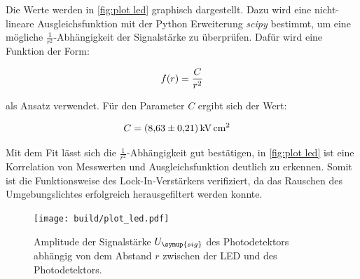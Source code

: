 Die Werte werden in \autoref{fig:plot led} graphisch dargestellt.
Dazu wird eine nicht-lineare Ausgleichsfunktion mit der Python Erweiterung \textit{scipy} \cite{scipy} bestimmt, um eine mögliche 
$\frac{1}{r^2}$-Abhängigkeit der Signalstärke zu überprüfen. Dafür wird eine Funktion der Form:

\begin{equation}
  f(r)=\frac{C}{r^2} \notag
\end{equation}

als Ansatz verwendet.
Für den Parameter $C$ ergibt sich der Wert:

\begin{align}
  C &= \qty{8.63+-0.21}{\kilo\volt\square\centi\metre} \notag
\end{align}

Mit dem Fit lässt sich die $\frac{1}{r^2}$-Abhängigkeit gut bestätigen, in \autoref{fig:plot led} ist eine Korrelation
von Messwerten und Ausgleichsfunktion deutlich zu erkennen.
Somit ist die Funktionsweise des Lock-In-Verstärkers verifiziert, da das Rauschen des Umgebungslichtes erfolgreich herausgefiltert
werden konnte.

\begin{figure}
  \centering
  \texttt{[image: build/plot\_led.pdf]}
  \caption{Amplitude der Signalstärke $U_{\symup{sig}}$ des Photodetektors abhängig von dem Abstand $r$ zwischen der LED und des Photodetektors.}
  \label{fig:plot led}
\end{figure}
